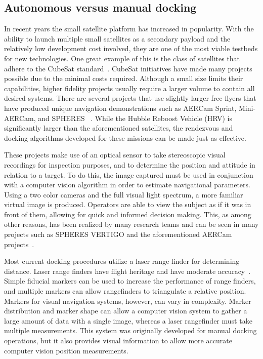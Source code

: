 \documentclass[onecolumn,10pt]{jhwhw}
\begin{document}
\subsection{Autonomous versus manual docking}
In recent years the small satellite platform has increased in popularity. With the ability to launch multiple small satellites as a secondary payload and the relatively low development cost involved, they are one of the most viable testbeds for new technologies. One great example of this is the class of satellites that adhere to the CubeSat standard~\cite{CubeSat}. CubeSat initiatives have made many projects possible due to the minimal costs required. Although a small size limits their capabilities, higher fidelity projects usually require a larger volume to contain all desired systems. There are several projects that use slightly larger free flyers that have produced unique navigation demonstrations such as AERCam Sprint, Mini-AERCam, and SPHERES ~\cite{Aercam,MiniAercam,SPHERES}. While the Hubble Reboost Vehicle (HRV) is significantly larger than the aforementioned satellites, the rendezvous and docking algorithms developed for these missions can be made just as effective.

These projects make use of an optical sensor to take stereoscopic visual recordings for inspection purposes, and to determine the position and attitude in relation to a target. To do this, the image captured must be used in conjunction with a computer vision algorithm in order to estimate navigational parameters. Using a two color cameras and the full visual light spectrum, a more familiar virtual image is produced. Operators are able to view the subject as if it was in front of them, allowing for quick and informed decision making. This, as among other reasons, has been realized by many research teams and can be seen in many projects such as SPHERES VERTIGO and the aforementioned AERCam projects~\cite{Aercam,MiniAercam,Vertigo1}.

Most current docking procedures utilize a laser range finder for determining distance. Laser range finders have flight heritage and have moderate accuracy~\cite{Docking}. Simple fiducial markers can be used to increase the performance of range finders, and multiple markers can allow rangefinders to triangulate a relative position. Markers for visual navigation systems, however, can vary in complexity. Marker distribution and marker shape can allow a computer vision system to gather a large amount of data with a single image, whereas a laser rangefinder must take multiple measurements. This system was originally developed for manual docking operations, but it also provides visual information to allow more accurate computer vision position measurements.
\end{document}
